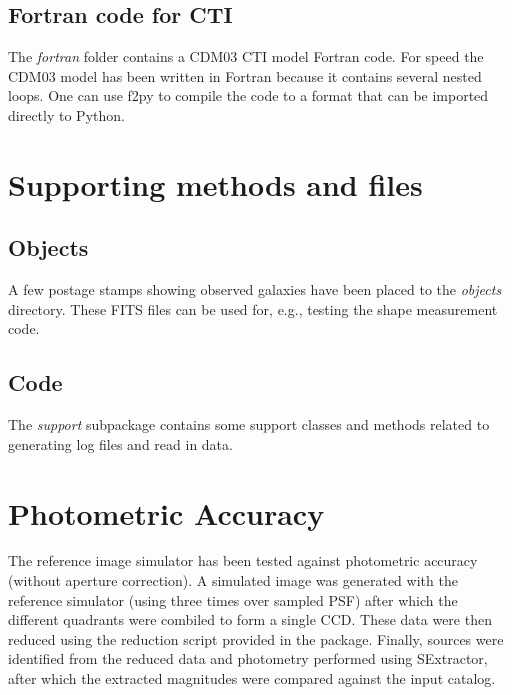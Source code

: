 \documentclass[a4paper,12pt,english]{sphinxmanual}
\begin{document}
\section{Fortran code for CTI}
\label{index:fortran-code-for-cti}
The \emph{fortran} folder contains a CDM03 CTI model Fortran code. For speed the CDM03 model has been written in Fortran
because it contains several nested loops. One can use f2py to compile the code to a format that can be imported
directly to Python.


\chapter{Supporting methods and files}
\label{index:supporting-methods-and-files}

\section{Objects}
\label{index:objects}
A few postage stamps showing observed galaxies have been placed to the \emph{objects} directory. These FITS files
can be used for, e.g., testing the shape measurement code.


\section{Code}
\label{index:code}
The \emph{support} subpackage contains some support classes and methods related to generating log files and read in
data.


\chapter{Photometric Accuracy}
\label{index:photometric-accuracy}
The reference image simulator has been tested against photometric accuracy (without aperture correction). A
simulated image was generated with the reference simulator (using three times over sampled PSF) after
which the different quadrants were combiled to form a single CCD. These data were then reduced using the
reduction script provided in the package. Finally, sources were identified from the reduced data and photometry performed
using SExtractor, after which the extracted magnitudes were compared against the input catalog.
\end{document}

